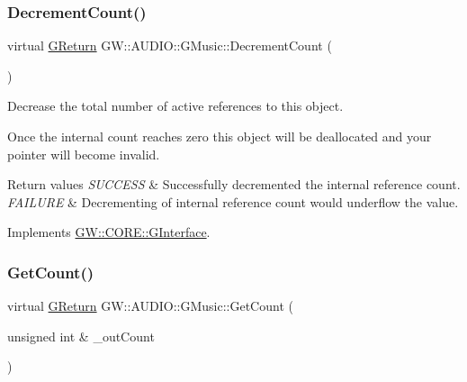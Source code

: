 \subsubsection{\texorpdfstring{DecrementCount()}{DecrementCount()}}
{\footnotesize\ttfamily virtual \mbox{\hyperlink{namespaceGW_a67a839e3df7ea8a5c5686613a7a3de21}{G\+Return}} G\+W\+::\+A\+U\+D\+I\+O\+::\+G\+Music\+::\+Decrement\+Count (\begin{DoxyParamCaption}{ }\end{DoxyParamCaption})\hspace{0.3cm}{\ttfamily [pure virtual]}}



Decrease the total number of active references to this object. 

Once the internal count reaches zero this object will be deallocated and your pointer will become invalid.


\begin{DoxyRetVals}{Return values}
{\em S\+U\+C\+C\+E\+SS} & Successfully decremented the internal reference count. \\
\hline
{\em F\+A\+I\+L\+U\+RE} & Decrementing of internal reference count would underflow the value. \\
\hline
\end{DoxyRetVals}


Implements \mbox{\hyperlink{classGW_1_1CORE_1_1GInterface_a19a368c77ad0aa7f49b5a4f772f173ba}{G\+W\+::\+C\+O\+R\+E\+::\+G\+Interface}}.

\mbox{\label{classGW_1_1AUDIO_1_1GMusic_ae41f54531b8325848215596fb2f821ac}} 
\subsubsection{\texorpdfstring{GetCount()}{GetCount()}}
{\footnotesize\ttfamily virtual \mbox{\hyperlink{namespaceGW_a67a839e3df7ea8a5c5686613a7a3de21}{G\+Return}} G\+W\+::\+A\+U\+D\+I\+O\+::\+G\+Music\+::\+Get\+Count (\begin{DoxyParamCaption}\item[{unsigned int \&}]{\+\_\+out\+Count }\end{DoxyParamCaption})\hspace{0.3cm}{\ttfamily [pure virtual]}}



